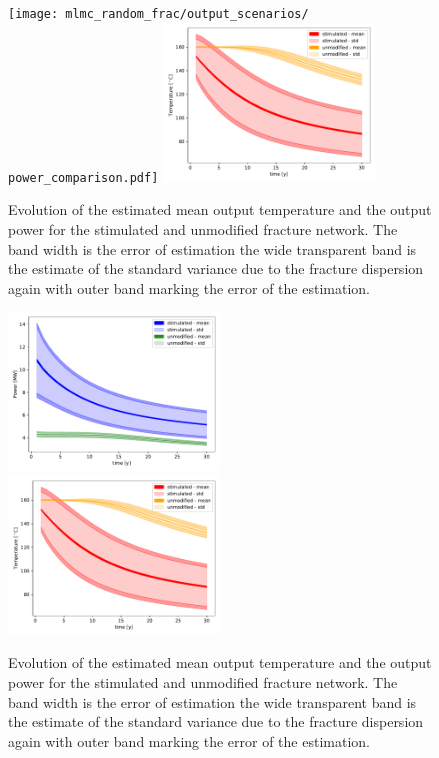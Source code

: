 \documentclass{article}
\begin{document}
\begin{figure}
\texttt{[image: mlmc\_random\_frac/output\_scenarios/ power\_comparison.pdf]}
\includegraphics[width=0.5\textwidth]{temp_comparison.pdf}
\caption{Evolution of the estimated mean output temperature and the output power for the stimulated and unmodified fracture network. The band width is the error of estimation the wide transparent band is the estimate of the standard variance due to the fracture dispersion again with outer band marking the error of the estimation.}
\end{figure}

\begin{figure}
\includegraphics[width=0.5\textwidth]{power_comparison.pdf}
\includegraphics[width=0.5\textwidth]{temp_comparison.pdf}
\caption{Evolution of the estimated mean output temperature and the output power for the stimulated and unmodified fracture network. The band width is the error of estimation the wide transparent band is the estimate of the standard variance due to the fracture dispersion again with outer band marking the error of the estimation.}
\end{figure}
\end{document}
